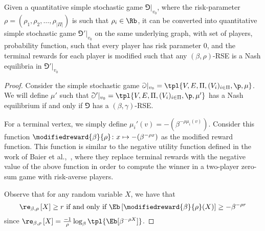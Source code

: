 \begin{lemma}\label{lemma:RSEtoQSSG}
Given a quantitative simple stochastic game $\Game|_{v_0}$, 
where the risk-parameter $\rho = (\rho_1,\rho_2,\dots,\rho_{|\Pi|})$ is such that $\rho_i\in \Rb$, 
it can be converted into quantitative simple stochastic game $\Game'|_{v_0}$ on the same underlying graph, with set of players, probability function, such that every player has risk parameter $0$, and the terminal rewards for each player is modified  such that any $(\beta,\rho)$-RSE is a Nash equilibria in $\Game'|_{v_0}$
\end{lemma}
\begin{proof}
    Consider the simple stochastic game $\Game|_{v_0} = \tpl{V,E,\Pi,(V_i)_{i\in \Pi},\p ,\mu}$. We will define $\mu'$ such that $\Game'|_{v_0} = \tpl{V,E,\Pi,(V_i)_{i\in \Pi},\p ,\mu'}$ has a Nash equilibrium if and only if $\Game$ has a $(\beta,\gamma)$-RSE.

    For a terminal vertex, we simply define $\mu_i'(v) = -(\beta^{-\rho\mu_i(v)})$. Consider this function $\modifiedreward{\beta}{\rho}\colon x\mapsto -(\beta^{-\rho x})$ as the modified reward function.  This function is similar to the negative utility function defined in the work of Baier et al.,~\cite{BCMP24}, where they replace terminal rewards with the negative value of the above function in order to compute the winner in a two-player zero-sum game with risk-averse players. 
    
    Observe that for any random variable $X$, we have that 
    \begin{equation}\label{inequality:REvsExp}    
    \re_{\beta,\rho}\left[X\right] \geq r\text{ if and only if }\Eb\left[\modifiedreward{\beta}{\rho}(X)\right] \geq -\beta^{-\rho r}\end{equation}
    since $\re_{\beta,\rho}\left[X\right] = \frac{-1}{\rho}\log_\beta\tpl{\Eb[\beta^{-\rho X}]}$.
    

\end{proof}
